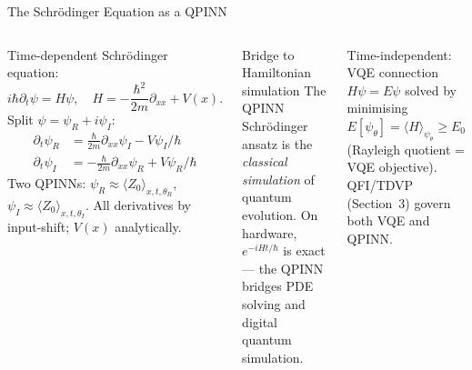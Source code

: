 \documentclass[aspectratio=169,11pt]{beamer}
\begin{document}
\begin{frame}{The Schr\"odinger Equation as a QPINN}
  \begin{columns}[T]
    Time-dependent Schr\"odinger equation:
    \[
      i\hbar\partial_t\psi = H\psi,\quad
      H = -\frac{\hbar^2}{2m}\partial_{xx} + V(x).
    \]
    Split $\psi = \psi_R + i\psi_I$:\vspace{-3pt}
    \begin{align*}
      \partial_t\psi_R
        &= \tfrac\hbar{2m}\partial_{xx}\psi_I - V\psi_I/\hbar\\
      \partial_t\psi_I
        &= -\tfrac\hbar{2m}\partial_{xx}\psi_R + V\psi_R/\hbar
    \end{align*}
    Two QPINNs: $\psi_R\!\approx\!\langle Z_0\rangle_{x,t,\theta_R}$,
    $\psi_I\!\approx\!\langle Z_0\rangle_{x,t,\theta_I}$.
    All derivatives by input-shift; $V(x)$ analytically.
    \begin{alertblock}{Bridge to Hamiltonian simulation}
      The QPINN Schr\"odinger ansatz is the
      \emph{classical simulation} of quantum evolution.
      On hardware, $e^{-iHt/\hbar}$ is exact --- the QPINN
      bridges PDE solving and digital quantum simulation.
    \end{alertblock}
    \begin{block}{Time-independent: VQE connection}
      $H\psi=E\psi$ solved by minimising
      $E[\psi_\theta]=\langle H\rangle_{\psi_\theta}\ge E_0$
      (Rayleigh quotient = VQE objective).
      QFI/TDVP (Section~3) govern both VQE and QPINN.
    \end{block}
  \end{columns}
\end{frame}
\end{document}
